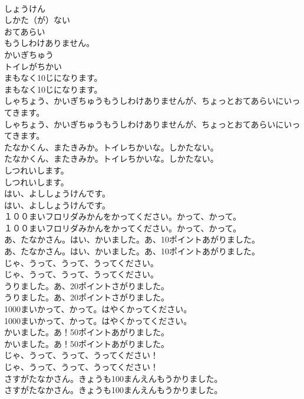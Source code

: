 \documentclass[8pt]{extreport}
\begin{document}
\begin{CJK}{UTF8}{min}
\\	しょうけん
\\	しかた（が）ない
\\	おてあらい
\\	もうしわけありません。
\\	かいぎちゅう
\\	トイレがちかい
\\	まもなく10じになります。	
\\	まもなく10じになります。 
\\	しゃちょう、かいぎちゅうもうしわけありませんが、ちょっとおてあらいにいってきます。	
\\	しゃちょう、かいぎちゅうもうしわけありませんが、ちょっとおてあらいにいってきます。 
\\	たなかくん、またきみか。トイレちかいな。しかたない。	
\\	たなかくん、またきみか。トイレちかいな。しかたない。 
\\	しつれいします。	
\\	しつれいします。 
\\	はい、よししょうけんです。	
\\	はい、よししょうけんです。 
\\	１００まいフロリダみかんをかってください。かって、かって。	
\\	１００まいフロリダみかんをかってください。かって、かって。 
\\	あ、たなかさん。はい、かいました。あ、10ポイントあがりました。	
\\	あ、たなかさん。はい、かいました。あ、10ポイントあがりました。 
\\	じゃ、うって、うって、うってください。	
\\	じゃ、うって、うって、うってください。 
\\	うりました。あ、20ポイントさがりました。	
\\	うりました。あ、20ポイントさがりました。 
\\	1000まいかって、かって。はやくかってください。	
\\	1000まいかって、かって。はやくかってください。 
\\	かいました。あ！50ポイントあがりました。	
\\	かいました。あ！50ポイントあがりました。 
\\	じゃ、うって、うって、うってください！	
\\	じゃ、うって、うって、うってください！ 
\\	さすがたなかさん。きょうも100まんえんもうかりました。	
\\	さすがたなかさん。きょうも100まんえんもうかりました。 

\end{CJK}
\end{document}
